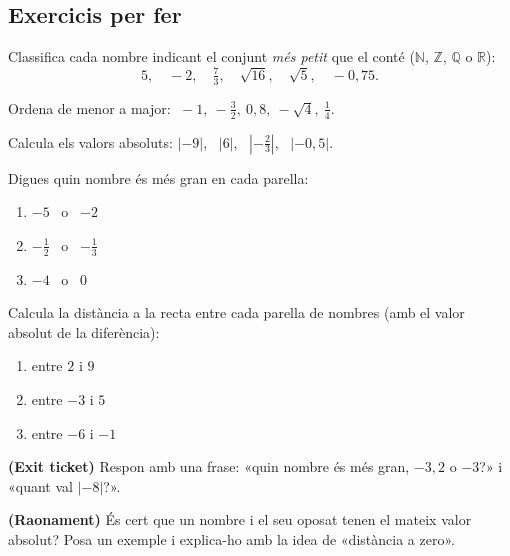 \subsection{Exercicis per fer}

\begin{exercicis}
\begin{exlist}
  \item Classifica cada nombre indicant el conjunt \emph{més petit} que el conté
        ($\mathbb{N}$, $\mathbb{Z}$, $\mathbb{Q}$ o $\mathbb{R}$):
        \[
        5,\quad -2,\quad \tfrac{7}{3},\quad \sqrt{16},\quad \sqrt{5},\quad -0,75.
        \]
  \item Ordena de menor a major: $\;-1,\ -\tfrac{3}{2},\ 0,8,\ -\sqrt{4},\ \tfrac{1}{4}$.
  \item Calcula els valors absoluts: $|{-9}|$, \ $|6|$, \ $\left|-\tfrac{2}{3}\right|$,
        \ $|{-0,5}|$.
  \item Digues quin nombre és més gran en cada parella:
        \begin{enumerate}[label=\alph*), leftmargin=1.6em, topsep=2pt]
          \item $-5$ \ o \ $-2$
          \item $-\tfrac{1}{2}$ \ o \ $-\tfrac{1}{3}$
          \item $-4$ \ o \ $0$
        \end{enumerate}
  \item Calcula la distància a la recta entre cada parella de nombres (amb el valor
        absolut de la diferència):
        \begin{enumerate}[label=\alph*), leftmargin=1.6em, topsep=2pt]
          \item entre $2$ i $9$ \hfill \item entre $-3$ i $5$ \hfill \item entre $-6$ i $-1$
        \end{enumerate}
  \item \textbf{(Exit ticket)} Respon amb una frase: «quin nombre és més gran,
        $-3,2$ o $-3$?» i «quant val $|{-8}|$?».
  \item \textbf{(Raonament)} És cert que un nombre i el seu oposat tenen el mateix
        valor absolut? Posa un exemple i explica-ho amb la idea de «distància a zero».
\end{exlist}
\end{exercicis}

